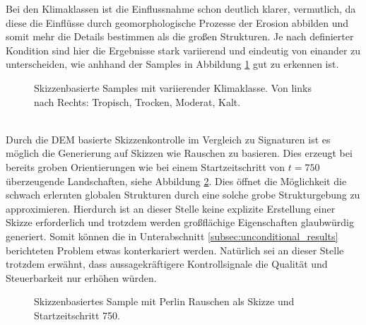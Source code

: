 Bei den Klimaklassen ist die Einflussnahme schon deutlich klarer, vermutlich, da diese die Einflüsse durch geomorphologische Prozesse der Erosion abbilden und somit mehr die Details bestimmen als die großen Strukturen. Je nach definierter Kondition sind hier die Ergebnisse stark variierend und eindeutig von einander zu unterscheiden, wie anhhand der Samples in Abbildung \ref{fig:sketch_climates} gut zu erkennen ist. 
\begin{figure}[htbp]
    \centering
    \caption{Skizzenbasierte Samples mit variierender Klimaklasse. Von links nach Rechts: Tropisch, Trocken, Moderat, Kalt.}
    \label{fig:sketch_climates}
\end{figure} \\
Durch die DEM basierte Skizzenkontrolle im Vergleich zu Signaturen ist es möglich die Generierung auf Skizzen wie Rauschen zu basieren. Dies erzeugt bei bereits groben Orientierungen wie bei einem Startzeitschritt von $t=750$ überzeugende Landschaften, siehe Abbildung \ref{fig:sketch_perlin}. Dies öffnet die Möglichkeit die schwach erlernten globalen Strukturen durch eine solche grobe Strukturgebung zu approximieren. Hierdurch ist an dieser Stelle keine explizite Erstellung einer Skizze erforderlich und trotzdem werden großflächige Eigenschaften glaubwürdig generiert. Somit können die in Unterabschnitt \ref{subsec:unconditional_results} berichteten Problem etwas konterkariert werden. Natürlich sei an dieser Stelle trotzdem erwähnt, dass aussagekräftigere Kontrollsignale die Qualität und Steuerbarkeit nur erhöhen würden.
\begin{figure}[htbp]
    \centering
    \caption{Skizzenbasiertes Sample mit Perlin Rauschen als Skizze und Startzeitschritt 750.}
    \label{fig:sketch_perlin}
\end{figure}

